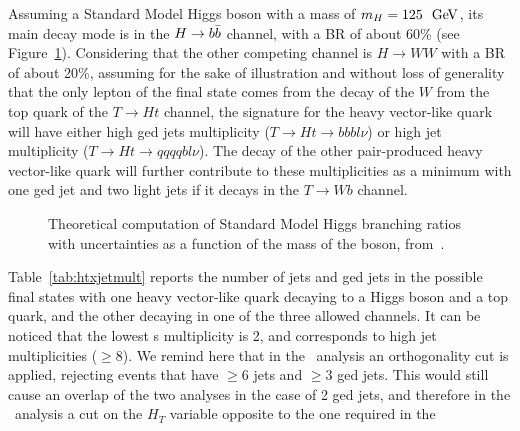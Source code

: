 Assuming a Standard Model Higgs boson with a mass of  $m_H= 125~\gev$,
its main decay mode is in the $H\to \bbbar$ channel, with a BR of about
60\% (see Figure~\ref{fig:HBR}). Considering that the other competing
channel is $H\to WW$ with a BR of about 20\%, assuming for the sake of 
illustration and without loss of generality that the only lepton of the
final state comes from the decay of the $W$ from the top quark of the
$T\to Ht$ channel, the signature for the heavy vector-like quark will
have either high \btag ged jets multiplicity ($T\to Ht\to bbbl\nu $)
or high jet multiplicity ($T\to Ht\to qqqqbl\nu $). The decay of the
other pair-produced heavy vector-like quark will further contribute
to these multiplicities as a minimum with one \btag ged jet and two
light jets if it decays in the $T\to Wb$ channel.
\begin{figure}[htb]\begin{center}
	\caption{Theoretical computation of Standard Model Higgs 
        branching ratios with uncertainties as a function of the 
        mass of the boson, from~\cite{Denner:2011mq}.\label{fig:HBR}}
\end{center}\end{figure}
Table~\ref{tab:htxjetmult} reports the number of jets and \btag ged jets
in the possible final states with one heavy vector-like quark decaying
to a Higgs boson and a top quark, and the other decaying in one
of the three allowed channels. It can be noticed that the lowest
\bjet s multiplicity is 2, and corresponds to high jet multiplicities
($\geq 8$). We remind here that in the \wbx\ analysis an orthogonality
cut is applied, rejecting events that have $\geq 6$ jets and $\geq 3$
\btag ged jets. This would still cause an overlap of the two analyses
in the case of 2 \btag ged jets, and therefore in the \htx\ analysis
a cut on the $H_T$ variable opposite to the one required in the 
